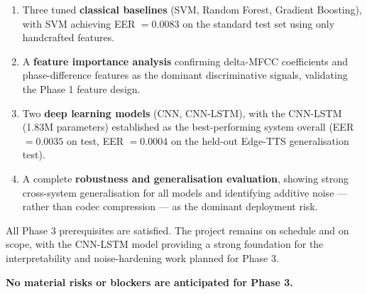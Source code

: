 \documentclass[12pt,a4paper]{report}
\begin{document}
\begin{enumerate}
  \item Three tuned \textbf{classical baselines} (SVM, Random Forest, Gradient Boosting),
    with SVM achieving EER $=0.0083$ on the standard test set using only handcrafted
    features.
  \item A \textbf{feature importance analysis} confirming delta-MFCC coefficients and
    phase-difference features as the dominant discriminative signals, validating the
    Phase 1 feature design.
  \item Two \textbf{deep learning models} (CNN, CNN-LSTM), with the CNN-LSTM
    (1.83M parameters) established as the best-performing system overall
    (EER $=0.0035$ on test, EER $=0.0004$ on the held-out Edge-TTS generalisation test).
  \item A complete \textbf{robustness and generalisation evaluation}, showing strong
    cross-system generalisation for all models and identifying additive noise --- rather
    than codec compression --- as the dominant deployment risk.
\end{enumerate}

All Phase 3 prerequisites are satisfied. The project remains on schedule and on scope, with
the CNN-LSTM model providing a strong foundation for the interpretability and
noise-hardening work planned for Phase 3.

\textbf{No material risks or blockers are anticipated for Phase 3.}
\end{document}

